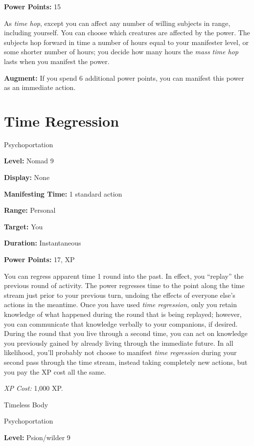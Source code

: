 \documentclass{article}
\begin{document}
\textbf{Power Points:} 15

As \textit{time hop}, except you can affect any number of willing subjects in range, 
including yourself. You can choose which creatures are affected by the power. The 
subjects hop forward in time a number of hours equal to your manifester level, 
or some shorter number of hours; you decide how many hours the \textit{mass time 
hop }lasts when you manifest the power.

\textbf{Augment:} If you spend 6 additional power points, you can manifest this 
power as an immediate action.

\vspace{12pt}
\section*{Time Regression}

Psychoportation

\textbf{Level:} Nomad 9

\textbf{Display:} None

\textbf{Manifesting Time:} 1 standard action

\textbf{Range:} Personal

\textbf{Target:} You

\textbf{Duration:} Instantaneous

\textbf{Power Points:} 17, XP

You can regress apparent time 1 round into the past. In effect, you ``replay'' 
the previous round of activity. The power regresses time to the point along the 
time stream just prior to your previous turn, undoing the effects of everyone else's 
actions in the meantime. Once you have used \textit{time regression, }only you 
retain knowledge of what happened during the round that is being replayed; however, 
you can communicate that knowledge verbally to your companions, if desired. During 
the round that you live through a second time, you can act on knowledge you previously 
gained by already living through the immediate future. In all likelihood, you'll 
probably not choose to manifest \textit{time regression }during your second pass 
through the time stream, instead taking completely new actions, but you pay the 
XP cost all the same.

\textit{XP Cost: }1,000 XP.

\vspace{12pt}
Timeless Body

Psychoportation

\textbf{Level:} Psion/wilder 9
\end{document}
